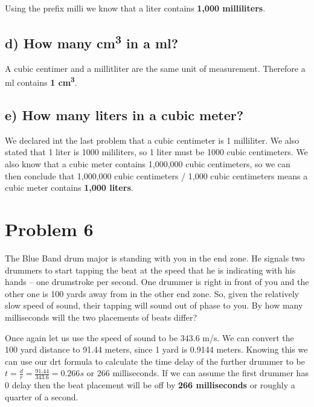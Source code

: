 \documentclass[]{article}
\begin{document}
Using the prefix milli we know that a liter contains \textbf{1,000
milliliters}.

\subsection{\texorpdfstring{d) How many cm\textsuperscript{3} in a
ml?}{d) How many cm3 in a ml?}}\label{d-how-many-cm3-in-a-ml}

A cubic centimer and a millitliter are the same unit of measurement.
Therefore a ml contains \textbf{1 cm\textsuperscript{3}}.

\subsection{e) How many liters in a cubic
meter?}\label{e-how-many-liters-in-a-cubic-meter}

We declared int the last problem that a cubic centimeter is 1
milliliter. We also stated that 1 liter is 1000 mililiters, so 1 liter
must be 1000 cubic centimeters. We also know that a cubic meter contains
1,000,000 cubic centimeters, so we can then conclude that 1,000,000
cubic centimeters / 1,000 cubic centimeters means a cubic meter contains
\textbf{1,000 liters}.

\section{Problem 6}\label{problem-6}

The Blue Band drum major is standing with you in the end zone. He
signals two drummers to start tapping the beat at the speed that he is
indicating with his hands -- one drumstroke per second. One drummer is
right in front of you and the other one is 100 yards away from in the
other end zone. So, given the relatively slow speed of sound, their
tapping will sound out of phase to you. By how many milliseconds will
the two placements of beats differ?

Once again let us use the speed of sound to be 343.6 m/s. We can convert
the 100 yard distance to 91.44 meters, since 1 yard is 0.9144 meters.
Knowing this we can use our drt formula to calculate the time delay of
the further drummer to be
\(t = \frac{d}{r} = \frac{91.44}{343.6} = 0.266 s\) or 266 milliseconds.
If we can assume the first drummer has 0 delay then the beat placement
will be off by \textbf{266 milliseconds} or roughly a quarter of a
second.
\end{document}
